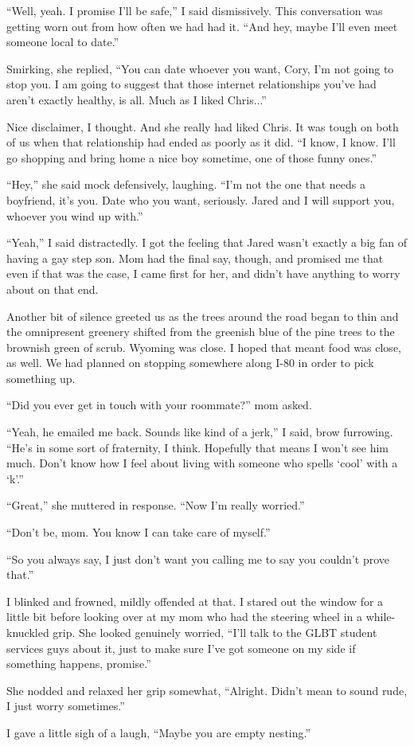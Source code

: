 ``Well, yeah.  I promise I'll be safe,'' I said dismissively.  This conversation was getting worn out from how often we had had it.  ``And hey, maybe I'll even meet someone local to date.''

Smirking, she replied, ``You can date whoever you want, Cory, I'm not going to stop you.  I am going to suggest that those internet relationships you've had aren't exactly healthy, is all.  Much as I liked Chris...''

Nice disclaimer, I thought.  And she really had liked Chris.  It was tough on both of us when that relationship had ended as poorly as it did.  ``I know, I know.  I'll go shopping and bring home a nice boy sometime, one of those funny ones.''

``Hey,'' she said mock defensively, laughing.  ``I'm not the one that needs a boyfriend, it's you.  Date who you want, seriously.  Jared and I will support you, whoever you wind up with.''

``Yeah,'' I said distractedly.  I got the feeling that Jared wasn't exactly a big fan of having a gay step son.  Mom had the final say, though, and promised me that even if that was the case, I came first for her, and didn't have anything to worry about on that end.

Another bit of silence greeted us as the trees around the road began to thin and the omnipresent greenery shifted from the greenish blue of the pine trees to the brownish green of scrub.  Wyoming was close.  I hoped that meant food was close, as well.  We had planned on stopping somewhere along I-80 in order to pick something up.


``Did you ever get in touch with your roommate?'' mom asked.

``Yeah, he emailed me back.  Sounds like kind of a jerk,'' I said, brow furrowing.  ``He's in some sort of fraternity, I think.  Hopefully that means I won't see him much.  Don't know how I feel about living with someone who spells `cool' with a `k'.''

``Great,'' she muttered in response.  ``Now I'm really worried.''

``Don't be, mom.  You know I can take care of myself.''

``So you always say, I just don't want you calling me to say you couldn't prove that.''

I blinked and frowned, mildly offended at that.  I stared out the window for a little bit before looking over at my mom who had the steering wheel in a while-knuckled grip.  She looked genuinely worried, ``I'll talk to the GLBT student services guys about it, just to make sure I've got someone on my side if something happens, promise.''

She nodded and relaxed her grip somewhat, ``Alright.  Didn't mean to sound rude, I just worry sometimes.''

I gave a little sigh of a laugh, ``Maybe you are empty nesting.''
